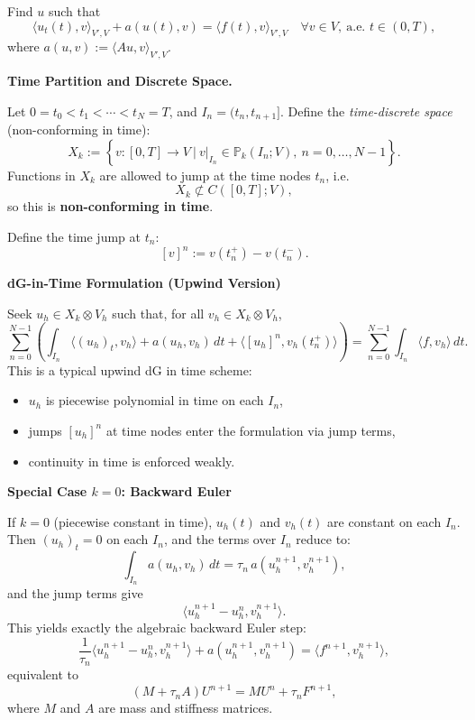 Find $u$ such that
\[
    \langle u_t(t), v\rangle_{V',V} + a(u(t),v) = \langle f(t), v\rangle_{V',V}
    \quad \forall v\in V,\ \text{a.e. }t\in (0,T),
\]
where $a(u,v) := \langle Au, v\rangle_{V',V}$.

\textbf{Time Partition and Discrete Space.}

Let $0=t_0 < t_1 < \cdots < t_N=T$, and $I_n=(t_n,t_{n+1}]$. Define the \emph{time-discrete space} (non-conforming in time):
\[
    X_k := \left\{
    v : [0,T] \to V\ \bigg|\
    v|_{I_n} \in \mathbb{P}_k(I_n; V),\ n=0,\dots,N-1
    \right\}.
\]
Functions in $X_k$ are allowed to jump at the time nodes $t_n$, i.e.
\[
    X_k \not\subset C([0,T];V),
\]
so this is \textbf{non-conforming in time}.

Define the time jump at $t_n$:
\[
    [v]^n := v(t_n^+) - v(t_n^-).
\]

\textbf{dG-in-Time Formulation (Upwind Version)}

Seek $u_h \in X_k \otimes V_h$ such that, for all $v_h \in X_k \otimes V_h$,
\[
    \sum_{n=0}^{N-1}
    \left(
    \int_{I_n} \langle (u_h)_t, v_h\rangle
    +
    a(u_h, v_h)\,dt
    +
    \langle [u_h]^n, v_h(t_n^+)\rangle
    \right)
    =
    \sum_{n=0}^{N-1}
    \int_{I_n} \langle f, v_h\rangle\,dt.
\]
This is a typical upwind dG in time scheme:
\begin{itemize}[leftmargin=*]
    \item $u_h$ is piecewise polynomial in time on each $I_n$,
    \item jumps $[u_h]^n$ at time nodes enter the formulation via jump terms,
    \item continuity in time is enforced weakly.
\end{itemize}

\textbf{Special Case $k=0$: Backward Euler}

If $k=0$ (piecewise constant in time), $u_h(t)$ and $v_h(t)$ are constant on each $I_n$.
Then $(u_h)_t = 0$ on each $I_n$, and the terms over $I_n$ reduce to:
\[
    \int_{I_n} a(u_h, v_h)\,dt = \tau_n \, a(u_h^{n+1}, v_h^{n+1}),
\]
and the jump terms give
\[
    \langle u_h^{n+1}-u_h^n, v_h^{n+1}\rangle.
\]
This yields exactly the algebraic backward Euler step:
\[
    \frac{1}{\tau_n}\langle u_h^{n+1}-u_h^n, v_h^{n+1}\rangle
    + a(u_h^{n+1}, v_h^{n+1})
    =
    \langle f^{n+1}, v_h^{n+1}\rangle,
\]
equivalent to
\[
    (M + \tau_n A)U^{n+1} = M U^n + \tau_n F^{n+1},
\]
where $M$ and $A$ are mass and stiffness matrices.

